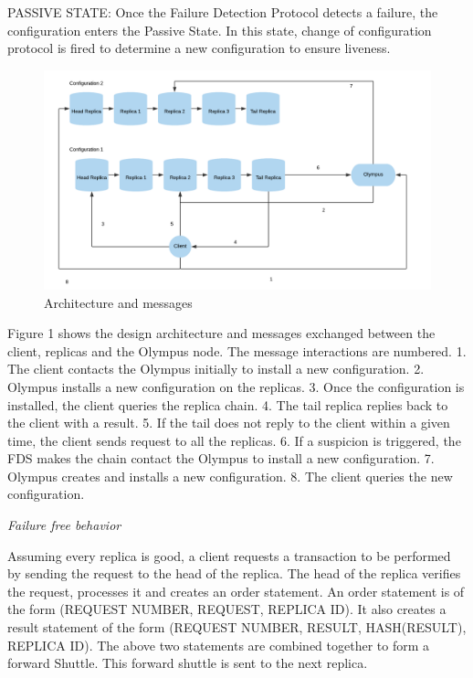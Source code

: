 \documentclass[letterpaper, 10 pt, conference]{ieeeconf}  %
\begin{document}
PASSIVE STATE: Once the Failure Detection Protocol detects a failure, the configuration enters the Passive State. In this state, change of configuration protocol is fired to determine a new configuration to ensure liveness. \smallskip

\begin{figure}
  \includegraphics[width=\linewidth]{Architecture}
  \centering
  \caption{Architecture and messages}
  \label{}
\end{figure}

Figure 1 shows the design architecture and messages exchanged between the client, replicas and the Olympus node. The message interactions are numbered.
1. The client contacts the Olympus initially to install a new configuration.
2. Olympus installs a new configuration on the replicas.
3. Once the configuration is installed, the client queries the replica chain.
4. The tail replica replies back to the client with a result.
5. If the tail does not reply to the client within a given time, the client sends request to all the replicas.
6. If a suspicion is triggered, the FDS makes the chain contact the Olympus to install a new configuration.
7. Olympus creates and installs a new configuration.
8. The client queries the new configuration.
\smallskip

\textit{Failure free behavior}

Assuming every replica is good, a client requests a transaction to be performed by sending the request to the head of the replica. The head of the replica verifies the request, processes it and creates an order statement. An order statement is of the form (REQUEST NUMBER, REQUEST, REPLICA ID).
It also creates a result statement of the form (REQUEST NUMBER, RESULT, HASH(RESULT), REPLICA ID). The above two statements are combined together to form a forward Shuttle. This forward shuttle is sent to the next replica. 
\end{document}
